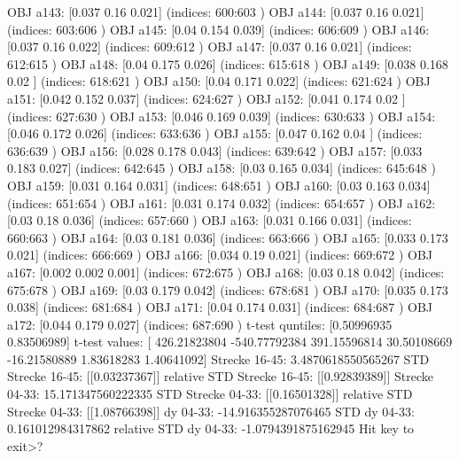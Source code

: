 OBJ a143: [0.037 0.16  0.021] (indices: 600:603 )
OBJ a144: [0.037 0.16  0.021] (indices: 603:606 )
OBJ a145: [0.04  0.154 0.039] (indices: 606:609 )
OBJ a146: [0.037 0.16  0.022] (indices: 609:612 )
OBJ a147: [0.037 0.16  0.021] (indices: 612:615 )
OBJ a148: [0.04  0.175 0.026] (indices: 615:618 )
OBJ a149: [0.038 0.168 0.02 ] (indices: 618:621 )
OBJ a150: [0.04  0.171 0.022] (indices: 621:624 )
OBJ a151: [0.042 0.152 0.037] (indices: 624:627 )
OBJ a152: [0.041 0.174 0.02 ] (indices: 627:630 )
OBJ a153: [0.046 0.169 0.039] (indices: 630:633 )
OBJ a154: [0.046 0.172 0.026] (indices: 633:636 )
OBJ a155: [0.047 0.162 0.04 ] (indices: 636:639 )
OBJ a156: [0.028 0.178 0.043] (indices: 639:642 )
OBJ a157: [0.033 0.183 0.027] (indices: 642:645 )
OBJ a158: [0.03  0.165 0.034] (indices: 645:648 )
OBJ a159: [0.031 0.164 0.031] (indices: 648:651 )
OBJ a160: [0.03  0.163 0.034] (indices: 651:654 )
OBJ a161: [0.031 0.174 0.032] (indices: 654:657 )
OBJ a162: [0.03  0.18  0.036] (indices: 657:660 )
OBJ a163: [0.031 0.166 0.031] (indices: 660:663 )
OBJ a164: [0.03  0.181 0.036] (indices: 663:666 )
OBJ a165: [0.033 0.173 0.021] (indices: 666:669 )
OBJ a166: [0.034 0.19  0.021] (indices: 669:672 )
OBJ a167: [0.002 0.002 0.001] (indices: 672:675 )
OBJ a168: [0.03  0.18  0.042] (indices: 675:678 )
OBJ a169: [0.03  0.179 0.042] (indices: 678:681 )
OBJ a170: [0.035 0.173 0.038] (indices: 681:684 )
OBJ a171: [0.04  0.174 0.031] (indices: 684:687 )
OBJ a172: [0.044 0.179 0.027] (indices: 687:690 )
t-test quntiles: [0.50996935 0.83506989]
t-test values: [ 426.21823804 -540.77792384  391.15596814   30.50108669  -16.21580889
    1.83618283    1.40641092]
Strecke 16-45: 3.4870618550565267
STD Strecke 16-45: [[0.03237367]]
relative STD Strecke 16-45: [[0.92839389]]%
Strecke 04-33: 15.171347560222335
STD Strecke 04-33: [[0.16501328]]
relative STD Strecke 04-33: [[1.08766398]]%
dy 04-33: -14.916355287076465
STD dy 04-33: 0.161012984317862
relative STD dy 04-33: -1.0794391875162945%
Hit key to exit>? 
